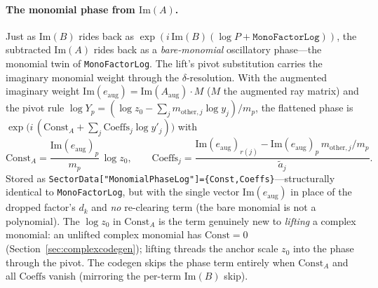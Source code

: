 \documentclass[11pt,a4paper]{article}
\begin{document}
\paragraph{The monomial phase from $\mathrm{Im}(A)$.} Just as $\mathrm{Im}(B)$ rides back as $\exp(i\,\mathrm{Im}(B)(\log P+\texttt{MonoFactorLog}))$, the subtracted $\mathrm{Im}(A)$ rides back as a \emph{bare-monomial} oscillatory phase---the monomial twin of \texttt{MonoFactorLog}. The lift's pivot substitution carries the imaginary monomial weight through the $\delta$-resolution. With the augmented imaginary weight $\mathrm{Im}(e_{\mathrm{aug}})=\mathrm{Im}(A_{\mathrm{aug}})\cdot M$ ($M$ the augmented ray matrix) and the pivot rule $\log Y_p=(\log z_0-\sum_j m_{\mathrm{other},j}\log y_j)/m_p$, the flattened phase is $\exp\!\bigl(i\,(\mathrm{Const}_A+\sum_j\mathrm{Coeffs}_j\log y'_j)\bigr)$ with
\begin{equation}\label{eq:monophase}
  \mathrm{Const}_A=\frac{\mathrm{Im}(e_{\mathrm{aug}})_p}{m_p}\,\log z_0,
  \qquad
  \mathrm{Coeffs}_j=\frac{\mathrm{Im}(e_{\mathrm{aug}})_{r(j)}-\mathrm{Im}(e_{\mathrm{aug}})_p\,m_{\mathrm{other},j}/m_p}{\tilde a_j}.
\end{equation}
Stored as \texttt{SectorData["MonomialPhaseLog"]=\{Const,Coeffs\}}---structurally identical to \texttt{MonoFactorLog}, but with the single vector $\mathrm{Im}(e_{\mathrm{aug}})$ in place of the dropped factor's $d_k$ and \emph{no} re-clearing term (the bare monomial is not a polynomial). The $\log z_0$ in $\mathrm{Const}_A$ is the term genuinely new to \emph{lifting} a complex monomial: an unlifted complex monomial has $\mathrm{Const}=0$ (Section~\ref{sec:complexcodegen}); lifting threads the anchor scale $z_0$ into the phase through the pivot. The codegen skips the phase term entirely when $\mathrm{Const}_A$ and all $\mathrm{Coeffs}$ vanish (mirroring the per-term $\mathrm{Im}(B)$ skip).
\end{document}
